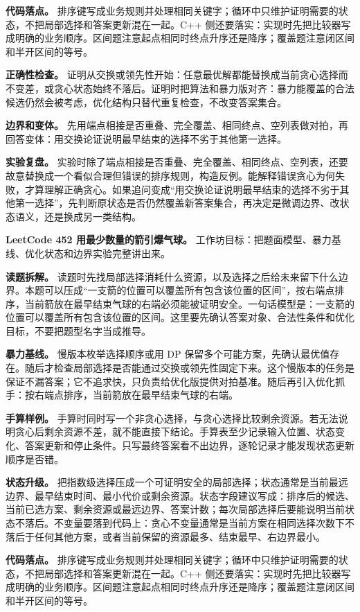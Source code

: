 \textbf{代码落点。} 排序键写成业务规则并处理相同关键字；循环中只维护证明需要的状态，不把局部选择和答案更新混在一起。C++ 侧还要落实：实现时先把比较器写成明确的业务顺序。区间题注意起点相同时终点升序还是降序；覆盖题注意闭区间和半开区间的等号。

\textbf{正确性检查。} 证明从交换或领先性开始：任意最优解都能替换成当前贪心选择而不变差，或贪心状态始终不落后。证明时把算法和暴力版对齐：暴力能覆盖的合法候选仍然会被考虑，优化结构只替代重复检查，不改变答案集合。

\textbf{边界和变体。} 先用端点相接是否重叠、完全覆盖、相同终点、空列表做对拍，再回答变体：用交换论证说明最早结束的选择不劣于其他第一选择。

\textbf{实验复盘。} 实验时除了端点相接是否重叠、完全覆盖、相同终点、空列表，还要故意替换成一个看似合理但错误的排序规则，构造反例。能解释错误贪心为何失败，才算理解正确贪心。如果追问变成“用交换论证说明最早结束的选择不劣于其他第一选择”，先判断原状态是否仍然覆盖新答案集合，再决定是微调边界、改状态语义，还是换成另一类结构。

\noindent\textbf{LeetCode 452 用最少数量的箭引爆气球。} 工作坊目标：把题面模型、暴力基线、优化状态和边界实验完整讲出来。

\textbf{读题拆解。} 读题时先找局部选择消耗什么资源，以及选择之后给未来留下什么边界。本题可以压成“一支箭的位置可以覆盖所有包含该位置的区间”，按右端点排序，当前箭放在最早结束气球的右端必须能被证明安全。一句话模型是：一支箭的位置可以覆盖所有包含该位置的区间。这里要先确认答案对象、合法性条件和优化目标，不要把题型名字当成推导。

\textbf{暴力基线。} 慢版本枚举选择顺序或用 DP 保留多个可能方案，先确认最优值存在。随后才检查局部选择是否能通过交换或领先性固定下来。这个慢版本的任务是保证不漏答案；它不追求快，只负责给优化版提供对拍基准。随后再引入优化抓手：按右端点排序，当前箭放在最早结束气球的右端。

\textbf{手算样例。} 手算时同时写一个非贪心选择，与贪心选择比较剩余资源。若无法说明贪心后剩余资源不差，就不能直接下结论。手算表至少记录输入位置、状态变化、答案更新和停止条件。只写最终答案看不出边界，逐轮记录才能发现状态更新顺序是否错。

\textbf{状态升级。} 把指数级选择压成一个可证明安全的局部选择；状态通常是当前最远边界、最早结束时间、最小代价或剩余资源。状态字段建议写成：排序后的候选、当前已选方案、剩余资源或最远边界、答案计数；每次局部选择后要能说明当前状态不落后。不变量要落到代码上：贪心不变量通常是当前方案在相同选择次数下不落后于任何其他方案，或者当前保留的资源最多、结束最早、右边界最小。

\textbf{代码落点。} 排序键写成业务规则并处理相同关键字；循环中只维护证明需要的状态，不把局部选择和答案更新混在一起。C++ 侧还要落实：实现时先把比较器写成明确的业务顺序。区间题注意起点相同时终点升序还是降序；覆盖题注意闭区间和半开区间的等号。

